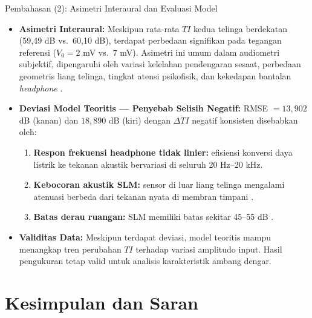 \documentclass[aspectratio=169, 10pt]{beamer}
\begin{document}
	\begin{frame}{Pembahasan (2): Asimetri Interaural dan Evaluasi Model}
		\begin{itemize}
			\item \textbf{Asimetri Interaural:}
			Meskipun rata-rata $TI$ kedua telinga berdekatan (59{,}49 dB vs.\ 60{,}10 dB), terdapat perbedaan signifikan pada tegangan referensi ($V_0 = 2$ mV vs.\ $7$ mV). Asimetri ini umum dalam audiometri subjektif, dipengaruhi oleh variasi kelelahan pendengaran sesaat, perbedaan geometris liang telinga, tingkat atensi psikofisik, dan kekedapan bantalan \textit{headphone} \parencite{ward2022}.

			\vspace{0.15cm}
			\item \textbf{Deviasi Model Teoritis --- Penyebab Selisih Negatif:}
			RMSE $= 13{,}902$ dB (kanan) dan $18{,}890$ dB (kiri) dengan $\overline{\Delta TI}$ negatif konsisten disebabkan oleh:
			\begin{enumerate}
				\footnotesize
				\item \textbf{Respon frekuensi headphone tidak linier:} efisiensi konversi daya listrik ke tekanan akustik bervariasi di seluruh 20 Hz--20 kHz.
				\item \textbf{Kebocoran akustik SLM:} sensor di luar liang telinga mengalami atenuasi berbeda dari tekanan nyata di membran timpani \parencite{ward2022}.
				\item \textbf{Batas derau ruangan:} SLM memiliki batas sekitar 45--55 dB \parencite{timdosen2026}.
			\end{enumerate}

			\vspace{0.1cm}
			\item \textbf{Validitas Data:}
			Meskipun terdapat deviasi, model teoritis mampu menangkap tren perubahan $TI$ terhadap variasi amplitudo input. Hasil pengukuran tetap valid untuk analisis karakteristik ambang dengar.
		\end{itemize}
	\end{frame}

	\section{Kesimpulan dan Saran}
\end{document}
